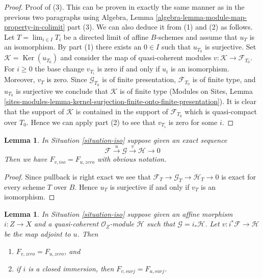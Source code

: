 \documentclass{stacks-project}
\theoremstyle{plain}
\newtheorem{lemma}[subsection]{Lemma}
\theoremstyle{definition}
\theoremstyle{remark}
\numberwithin{equation}{subsection}
\def\lim{\mathop{\mathrm{lim}}\nolimits}
\def\Ker{\mathop{\mathrm{Ker}}}
\begin{document}
\begin{proof}
\medskip\noindent
Proof of (3). This can be proven in exactly the same manner as in the
previous two paragraphs using
Algebra, Lemma \ref{algebra-lemma-module-map-property-in-colimit} part (3).
We can also deduce it from (1) and (2) as follows.
Let $T = \lim_{i \in I} T_i$ be a directed limit of affine $B$-schemes
and assume that $u_T$ is an isomorphism. By part (1) there exists
an $0 \in I$ such that $u_{T_0}$ is surjective. Set
$\mathcal{K} = \Ker(u_{T_0})$ and consider the map of quasi-coherent
modules $v : \mathcal{K} \to \mathcal{F}_{T_0}$. For $i \geq 0$ the base
change $v_{T_i}$ is zero if and only if $u_i$ is an isomorphism. Moreover,
$v_T$ is zero. Since $\mathcal{G}_{T_0}$
is of finite presentation, $\mathcal{F}_{T_0}$ is of finite type, and
$u_{T_0}$ is surjective we conclude that $\mathcal{K}$ is of finite type
(Modules on Sites, Lemma
\ref{sites-modules-lemma-kernel-surjection-finite-onto-finite-presentation}).
It is clear that the support of $\mathcal{K}$ is contained in the
support of $\mathcal{F}_{T_0}$ which is quasi-compact over $T_0$.
Hence we can apply part (2) to see that $v_{T_i}$ is zero for some $i$.
\end{proof}

\begin{lemma}
\label{lemma-relate-zero-iso}
In Situation \ref{situation-iso} suppose given an exact sequence
$$
\mathcal{F} \xrightarrow{u} \mathcal{G} \xrightarrow{v} \mathcal{H} \to 0
$$
Then we have $F_{v, iso} = F_{u, zero}$ with obvious notation.
\end{lemma}

\begin{proof}
Since pullback is right exact we see that
$\mathcal{F}_T \to \mathcal{G}_T \to \mathcal{H}_T \to 0$
is exact for every scheme $T$ over $B$. Hence $u_T$ is
surjective if and only if $v_T$ is an isomorphism.
\end{proof}

\begin{lemma}
\label{lemma-relate-zero-affine}
In Situation \ref{situation-iso} suppose given an affine morphism
$i : Z \to X$ and a quasi-coherent $\mathcal{O}_Z$-module $\mathcal{H}$
such that $\mathcal{G} = i_*\mathcal{H}$. Let
$v : i^*\mathcal{F} \to \mathcal{H}$ be the map adjoint to $u$.
Then
\begin{enumerate}
\item $F_{v, zero} = F_{u, zero}$, and
\item if $i$ is a closed immersion, then $F_{v, surj} = F_{u, surj}$.
\end{enumerate}
\end{lemma}
\end{document}
